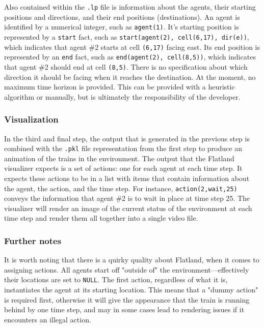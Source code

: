 \documentclass[11pt]{article}
\begin{document}
Also contained within the \texttt{.lp} file is information about the agents, their starting positions and directions, and their end positions (destinations).  An agent is identified by a numerical integer, such as \texttt{agent(1)}.  It's starting position is represented by a \texttt{start} fact, such as \texttt{start(agent(2), cell(6,17), dir(e))}, which indicates that agent \#2 starts at cell \texttt{(6,17)} facing east. Its end position is represented by an \texttt{end} fact, such as \texttt{end(agent(2), cell(8,5))}, which indicates that agent \#2 should end at cell \texttt{(8,5)}. There is no specification about which direction it should be facing when it reaches the destination. At the moment, no maximum time horizon is provided. This can be provided with a heuristic algorithm or manually, but is ultimately the responsibility of the developer.

\subsubsection{Visualization}
In the third and final step, the output that is generated in the previous step is combined with the \texttt{.pkl} file representation from the first step to produce an animation of the trains in the environment. The output that the Flatland visualizer expects is a set of actions: one for each agent at each time step. It expects these actions to be in a list with items that contain information about the agent, the action, and the time step. For instance, \texttt{action(2,wait,25)} conveys the information that agent \#2 is to wait in place at time step 25. The visualizer will render an image of the current status of the environment at each time step and render them all together into a single video file.

\subsubsection{Further notes}
It is worth noting that there is a quirky quality about Flatland, when it comes to assigning actions. All agents start off "outside of" the environment—effectively their locations are set to \texttt{NULL}. The first action, regardless of what it is, instantiates the agent at its starting location. This means that a "dummy action" is required first, otherwise it will give the appearance that the train is running behind by one time step, and may in some cases lead to rendering issues if it encounters an illegal action.
\end{document}
